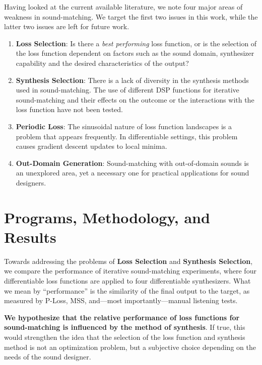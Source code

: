 \documentclass[lettersize,journal]{IEEEtran}
\newcommand{\LossSelect}{\textbf{Loss Selection}}
\newcommand{\SynthSelect}{\textbf{Synthesis Selection}}
\newcommand{\PeriodicLoss}{\textbf{Periodic Loss}}
\newcommand{\OutDomain}{\textbf{Out-Domain Generation}}
\begin{document}

Having looked at the current available literature, we note four major areas of weakness in sound-matching. We target the first two issues in this work, while the latter two issues are left for future work. 
\begin{enumerate}
    \item \LossSelect: Is there a \textit{best performing} loss function, or is the selection of the loss function dependent on factors such as the sound domain, synthesizer capability and the desired characteristics of the output? 
    \item \SynthSelect: There is a lack of diversity in the synthesis methods used in sound-matching. The use of different DSP functions for iterative sound-matching and their effects on the outcome or the interactions with the loss function have not been tested.
    \item \PeriodicLoss: The sinusoidal nature of loss function landscapes is a problem that appears frequently. In differentiable settings, this problem causes gradient descent updates to local minima. 
    \item \OutDomain: Sound-matching with out-of-domain sounds is an unexplored area, yet a necessary one for practical applications for sound designers.
\end{enumerate}

\section{Programs, Methodology, and Results}
\label{sec:progs_methodology_results}
Towards addressing the problems of \LossSelect{} and \SynthSelect{}, we compare the performance of iterative sound-matching experiments, where four differentiable loss functions are applied to four differentiable synthesizers. What we mean by ``performance'' is the similarity of the final output to the target, as measured by P-Loss, MSS, and---most importantly---manual listening tests.

\textbf{We hypothesize that the relative performance of loss functions for sound-matching is influenced by the method of synthesis}. If true, this would strengthen the idea that the selection of the loss function and synthesis method is not an optimization problem, but a subjective choice depending on the needs of the sound designer. 
\end{document}
